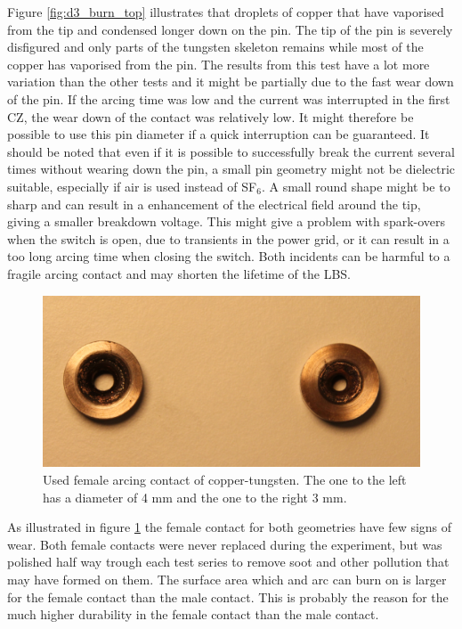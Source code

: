 \documentclass[10pt,a4paper]{article} %
\begin{document}
Figure \ref{fig:d3_burn_top} illustrates that droplets of copper that have vaporised from the tip and condensed longer down on the pin. The tip of the pin is severely disfigured and only parts of the tungsten skeleton remains while most of the copper has vaporised from the pin. The results from this test have a lot more variation than the other tests and it might be partially due to the fast wear down of the pin. If the arcing time was low and the current was interrupted in the first CZ, the wear down of the contact was relatively low. It might therefore be possible to use this pin diameter if a quick interruption can be guaranteed. It should be noted that even if it is possible to successfully break the current several times without wearing down the pin, a small pin geometry might not be dielectric suitable, especially if air is used instead of SF$_6$. A small round shape might be to sharp and can result in a enhancement of the electrical field around the tip, giving a smaller breakdown voltage. This might give a problem with spark-overs when the switch is open, due to transients in the power grid, or it can result in a too long arcing time when closing the switch. Both incidents can be harmful to a fragile arcing contact and may shorten the lifetime of the LBS.


\begin{figure}[H]
\centering
\includegraphics[scale=0.4]{Bilder/Discussion/femaleContacts4mmand3mm.png}
\caption{Used female arcing contact of copper-tungsten. \newline The one to the left has a diameter of 4 mm and the one to the right 3 mm.} \label{fig:used_d4_d3_female}
\end{figure}

As illustrated in figure \ref{fig:used_d4_d3_female} the female contact for both geometries have few signs of wear. Both female contacts were never replaced during the experiment, but was polished half way trough each test series to remove soot and other pollution that may have formed on them. The surface area which and arc can burn on is larger for the female contact than the male contact. This is probably the reason for the much higher durability in the female contact than the male contact.
 
\end{document}
